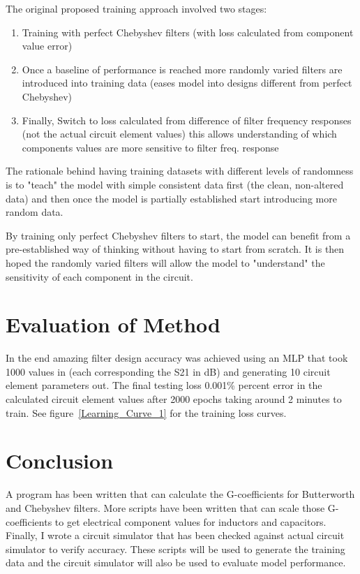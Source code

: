 \documentclass[10pt,conference]{IEEEtran}
\begin{document}
\vspace{1em}


The original proposed training approach involved two stages:
\begin{enumerate}[label=\arabic*)]
    \item Training with perfect Chebyshev filters (with loss calculated from component value error)
    \item Once a baseline of performance is reached more randomly varied filters are introduced into training data (eases model into designs different from perfect Chebyshev)
    \item Finally, Switch to loss calculated from difference of filter frequency responses (not the actual circuit element values)
    	\subitem this allows understanding of which components values are more sensitive to filter freq. response
\end{enumerate}

\vspace{1em}

The rationale behind having training datasets with different levels of randomness is to "teach" the model with simple consistent data first (the clean, non-altered data) and then once the model is partially established start introducing more random data.

By training only perfect Chebyshev filters to start, the model can benefit from a pre-established way of thinking without having to start from scratch. It is then hoped the randomly varied filters will allow the model to "understand" the sensitivity of each component in the circuit. 


\section{Evaluation of Method}


In the end amazing filter design accuracy was achieved using an MLP that took 1000 values in (each corresponding the S21 in dB) and generating 10 circuit element parameters out. The final testing loss 0.001\% percent error in the calculated circuit element values after 2000 epochs taking around 2 minutes to train. See figure~\ref{Learning_Curve_1} for the training loss curves.





\section{Conclusion}
A program has been written that can calculate the G-coefficients for Butterworth and Chebyshev filters. More scripts have been written that can scale those G-coefficients to get electrical component values for inductors and capacitors. Finally, I wrote a circuit simulator that has been checked against actual circuit simulator to verify accuracy. These scripts will be used to generate the training data and the circuit simulator will also be used to evaluate model performance.
\end{document}
